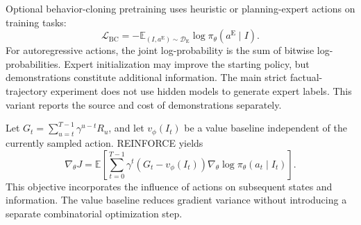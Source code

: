 \documentclass[a4paper,11pt]{article}
\newcommand{\E}{\mathbb E}
\numberwithin{equation}{section}
\begin{document}
Optional behavior-cloning pretraining uses heuristic or planning-expert actions on training tasks:
\begin{equation}
\mathcal L_{\mathrm{BC}}=-\E_{(I,a^{\mathrm E})\sim\mathcal D_{\mathrm E}}
\log\pi_\theta(a^{\mathrm E}\mid I).
\end{equation}
For autoregressive actions, the joint log-probability is the sum of bitwise log-probabilities. Expert initialization may improve the starting policy, but demonstrations constitute additional information. The main strict factual-trajectory experiment does not use hidden models to generate expert labels. This variant reports the source and cost of demonstrations separately.

Let $G_t=\sum_{u=t}^{T-1}\gamma^{u-t}R_u$, and let $v_\phi(I_t)$ be a value baseline independent of the currently sampled action. REINFORCE\citep{williams1992} yields
\begin{equation}
\nabla_\theta J=\E\left[\sum_{t=0}^{T-1}\gamma^t
(G_t-v_\phi(I_t))\nabla_\theta\log\pi_\theta(a_t\mid I_t)\right].
\label{eq:reinforce}
\end{equation}
This objective incorporates the influence of actions on subsequent states and information. The value baseline reduces gradient variance without introducing a separate combinatorial optimization step.
\end{document}

